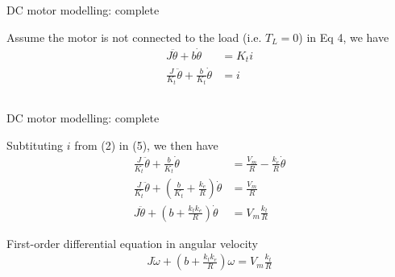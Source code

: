 \subsection{}
{
\begin{frame}{DC motor modelling: complete}

Assume the motor is not connected to the load (i.e. $T_L=0$)
in Eq 4, we have
\begin{equation}
\begin{split}
J \ddot{ \theta} + b \dot \theta  &= K_t i \\
\frac{J}{K_t} \ddot{ \theta} + \frac{b}{K_t} \dot \theta &= i
\end{split}
\end{equation}


\end{frame}
}



\subsection{}
{
\begin{frame}{DC motor modelling: complete}


Subtituting $i$ from (2) in (5), we then have
\begin{equation}
\begin{split}
\frac{J}{K_t} \ddot{ \theta} + \frac{b}{K_t} \dot \theta & = \frac{V_m}{R} - \frac{k_e}{R} \dot \theta \\
\frac{J}{K_t} \ddot{ \theta} + (\frac{b}{K_t}  + \frac{k_e}{R} ) \dot \theta & = \frac{V_m}{R} \\
J \ddot{ \theta} + (b + \frac{ k_t k_e }{R} ) \dot \theta & = V_m \frac{k_t}{R}
\end{split}
\end{equation}


First-order differential equation in angular velocity
\begin{equation*}
\begin{split}
J \dot \omega + (b + \frac{ k_t k_e }{R} ) \omega = V_m \frac{k_t}{R}
\end{split}
\end{equation*}


\end{frame}
}



